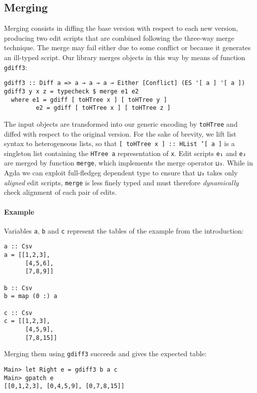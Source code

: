 \documentclass{sigplanconf}
\theoremstyle{plain}
\begin{document}
\subsection{Merging}
Merging consists in diffing the base version with respect to each new
version, producing two edit scripts that are combined following the
three-way merge technique.
%
The merge may fail either due to some conflict or because it generates
an ill-typed script.
%
Our library merges objects in this way by means of function \texttt{gdiff3}:
\begin{verbatim}
gdiff3 :: Diff a => a → a → a → Either [Conflict] (ES '[ a ] '[ a ])
gdiff3 y x z = typecheck $ merge e1 e2
  where e1 = gdiff [ toHTree x ] [ toHTree y ]
         e2 = gdiff [ toHTree x ] [ toHTree z ]
\end{verbatim}
The input objects are transformed into our generic encoding by
\texttt{toHTree} and diffed with respect to the original version.
%
For the sake of brevity, we lift list syntax to heterogeneous lists,
so that \texttt{[ toHTree x ] :: HList '[ a ]} is a singleton list
containing the \texttt{HTree a} representation of \texttt{x}.
%
Edit scripts \texttt{e₁} and \texttt{e₂} are merged by function
\texttt{merge}, which implements the merge operator \texttt{⊔₃}.
%
While in Agda we can exploit full-fledgeg dependent type to ensure
that \texttt{⊔₃} takes only \emph{aligned} edit scripts,
\texttt{merge} is less finely typed and must therefore
\emph{dynamically} check alignment of each pair of edits.
%

\paragraph{Example}
Variables \texttt{a}, \texttt{b} and \texttt{c} represent the tables
of the example from the introduction:
\begin{verbatim}
a :: Csv
a = [[1,2,3],
      [4,5,6],
      [7,8,9]]

b :: Csv
b = map (0 :) a

c :: Csv
c = [[1,2,3],
      [4,5,9],
      [7,8,15]]
\end{verbatim}
Merging them using \texttt{gdiff3} succeeds and gives the expected table:
\begin{verbatim}
Main> let Right e = gdiff3 b a c
Main> gpatch e
[[0,1,2,3], [0,4,5,9], [0,7,8,15]]
\end{verbatim}



\end{document}
